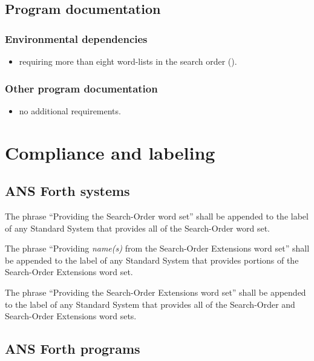 \subsection{Program documentation} %

\subsubsection{Environmental dependencies} %

\begin{itemize}
\item requiring more than eight word-lists in the search order
	().
\end{itemize}

\subsubsection{Other program documentation} %

\begin{itemize}
\item no additional requirements.
\end{itemize}


\section{Compliance and labeling} %

\subsection{ANS Forth systems} %

The phrase ``Providing the Search-Order word set'' shall be
appended to the label of any Standard System that provides all of
the Search-Order word set.

The phrase ``Providing \emph{name(s)} from the Search-Order
Extensions word set'' shall be appended to the label of any
Standard System that provides portions of the Search-Order
Extensions word set.

The phrase ``Providing the Search-Order Extensions word set'' shall
be appended to the label of any Standard System that provides all of
the Search-Order and Search-Order Extensions word sets.

\subsection{ANS Forth programs} %

